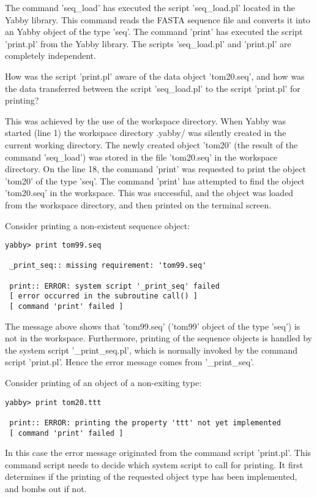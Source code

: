 The command 'seq\_load' has executed the script 'seq\_load.pl'
located in the Yabby library. This command reads the FASTA sequence
file and converts it into an Yabby object of the type 'seq'. The
command 'print' has executed the script 'print.pl' from the Yabby
library. The scripts 'seq\_load.pl' and 'print.pl' are completely
independent.

How was the script 'print.pl' aware of the data object 'tom20.seq',
and how was the data transferred between the script 'seq\_load.pl'
to the script 'print.pl' for printing?

This was achieved by the use of the workspace directory. When Yabby
was started (line 1) the workspace directory .yabby/ was silently
created in the current working directory. The newly created object
'tom20' (the result of the command 'seq\_load') was stored in the
file 'tom20.seq' in the workspace directory. On the line 18, the
command 'print' was requested to print the object 'tom20' of the
type 'seq'. The command 'print' has attempted to find the object
'tom20.seq' in the workspace. This was successful, and the object
was loaded from the workspace directory, and then printed on the
terminal screen.

Consider printing a non-existent sequence object:

\begin{verbatim}
yabby> print tom99.seq

 _print_seq:: missing requirement: 'tom99.seq'

 print:: ERROR: system script '_print_seq' failed
 [ error occurred in the subroutine call() ]
 [ command 'print' failed ]
\end{verbatim}

The message above shows that 'tom99.seq' ('tom99' object of the 
type 'seq') is not in the workspace. Furthermore, printing of the
sequence objects is handled by the system script '\_print\_seq.pl',
which is normally invoked by the command script 'print.pl'. Hence
the error message comes from '\_print\_seq'.

Consider printing of an object of a non-exiting type:

\begin{verbatim}
yabby> print tom20.ttt

 print:: ERROR: printing the property 'ttt' not yet implemented
 [ command 'print' failed ]
\end{verbatim}

In this case the error message originated from the command script
'print.pl'. This command script needs to decide which system script
to call for printing. It first determines if the printing of the
requested object type has been implemented, and bombs out if not.

